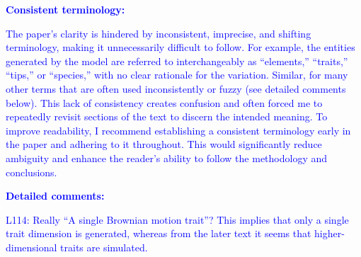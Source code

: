 \documentclass[
]{article}
\begin{document}
\textcolor{blue}{\textbf{Consistent terminology:}}

\textcolor{blue}{The paper's clarity is hindered by inconsistent, imprecise, and shifting terminology, making it unnecessarily difficult to follow.
For example, the entities generated by the model are referred to interchangeably as ``elements,'' ``traits,'' ``tips,'' or ``species,'' with no clear rationale for the variation.
Similar, for many other terms that are often used inconsistently or fuzzy (see detailed comments below).
This lack of consistency creates confusion and often forced me to repeatedly revisit sections of the text to discern the intended meaning.
To improve readability, I recommend establishing a consistent terminology early in the paper and adhering to it throughout.
This would significantly reduce ambiguity and enhance the reader's ability to follow the methodology and conclusions.}


\textcolor{blue}{\textbf{Detailed comments:}}

\textcolor{blue}{L114: Really ``A single Brownian motion trait''? This implies that only a single trait dimension is generated, whereas from the later text it seems that higher-dimensional traits are simulated.}
\end{document}
